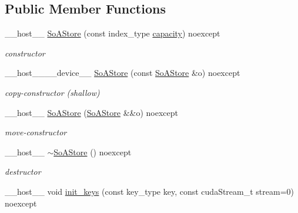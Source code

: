 \subsection*{Public Member Functions}
\begin{DoxyCompactItemize}
\item 
\+\_\+\+\_\+host\+\_\+\+\_\+ \hyperlink{classwarpcore_1_1storage_1_1key__value_1_1SoAStore_a4dc140aa67de81f7bdff2bc16f6a1b8b}{So\+A\+Store} (const index\+\_\+type \hyperlink{classwarpcore_1_1storage_1_1key__value_1_1SoAStore_a2ae1c90988d891741861e6e6d571ec00}{capacity}) noexcept
\begin{DoxyCompactList}\small\item\em constructor \end{DoxyCompactList}\item 
\+\_\+\+\_\+host\+\_\+\+\_\+\+\_\+\+\_\+device\+\_\+\+\_\+ \hyperlink{classwarpcore_1_1storage_1_1key__value_1_1SoAStore_afa42ed6e282fadc26ebbc583617978f4}{So\+A\+Store} (const \hyperlink{classwarpcore_1_1storage_1_1key__value_1_1SoAStore}{So\+A\+Store} \&o) noexcept
\begin{DoxyCompactList}\small\item\em copy-\/constructor (shallow) \end{DoxyCompactList}\item 
\+\_\+\+\_\+host\+\_\+\+\_\+ \hyperlink{classwarpcore_1_1storage_1_1key__value_1_1SoAStore_a6a81007ef10db9fce8c75e3781a50ee3}{So\+A\+Store} (\hyperlink{classwarpcore_1_1storage_1_1key__value_1_1SoAStore}{So\+A\+Store} \&\&o) noexcept
\begin{DoxyCompactList}\small\item\em move-\/constructor \end{DoxyCompactList}\item 
\mbox{\label{classwarpcore_1_1storage_1_1key__value_1_1SoAStore_ae55577a94a59de733f3d377024beeb92}} 
\+\_\+\+\_\+host\+\_\+\+\_\+ \hyperlink{classwarpcore_1_1storage_1_1key__value_1_1SoAStore_ae55577a94a59de733f3d377024beeb92}{$\sim$\+So\+A\+Store} () noexcept
\begin{DoxyCompactList}\small\item\em destructor \end{DoxyCompactList}\item 
\+\_\+\+\_\+host\+\_\+\+\_\+ void \hyperlink{classwarpcore_1_1storage_1_1key__value_1_1SoAStore_a7de9b497084433d27ae6ac63745ba541}{init\+\_\+keys} (const key\+\_\+type key, const cuda\+Stream\+\_\+t stream=0) noexcept

\end{DoxyCompactItemize}
